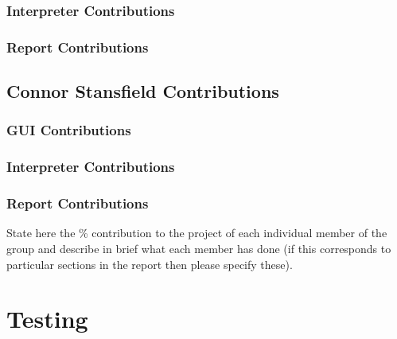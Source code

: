 \documentclass[a4paper, oneside, 11pt]{report}
\begin{document}
    \subsection{Interpreter Contributions}
    \subsection{Report Contributions}

    \section{Connor Stansfield Contributions}
    \subsection{GUI Contributions}
    \subsection{Interpreter Contributions}
    \subsection{Report Contributions}

    State here the \% contribution to the project of each individual member of the group and describe in brief what each member has done (if this corresponds to particular sections in the report then please specify these).

    \chapter{Testing}
    \label{app:test}

\end{document}
